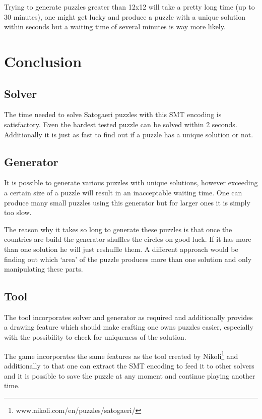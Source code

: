 Trying to generate puzzles greater than 12x12 will take a pretty long time (up to 30 minutes), one might get lucky and produce a puzzle with a unique solution within seconds but a waiting time of several minutes is way more likely.

\chapter{Conclusion} \label{Conclusion}
\section{Solver}
The time needed to solve Satogaeri puzzles with this SMT encoding is satisfactory. Even the hardest tested puzzle can be solved within 2 seconds. Additionally it is just as fast to find out if a puzzle has a unique solution or not.

\section{Generator}
It is possible to generate various puzzles with unique solutions, however exceeding a certain size of a puzzle will result in an inacceptable waiting time. One can produce many small puzzles using this generator but for larger ones it is simply too slow.

The reason why it takes so long to generate these puzzles is that once the countries are build the generator shuffles the circles on good luck. If it has more than one solution he will just reshuffle them. A different approach would be finding out which `area' of the puzzle produces more than one solution and only manipulating these parts.

\section{Tool}
The tool incorporates solver and generator as required and additionally provides a drawing feature which should make crafting one owns puzzles easier, especially with the possibility to check for uniqueness of the solution.

The game incorporates the same features as the tool created by Nikoli\footnote{www.nikoli.com/en/puzzles/satogaeri/} and additionally to that one can extract the SMT encoding to feed it to other solvers and it is possible to save the puzzle at any moment and continue playing another time.

